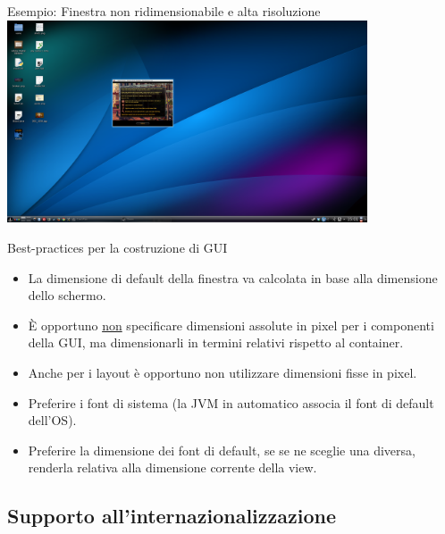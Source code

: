 \documentclass[presentation]{beamer}
\begin{document}
\begin{frame}{Esempio: Finestra non ridimensionabile e alta risoluzione}
\centering
\includegraphics[width=0.8\textwidth]{img/brokensword}
\end{frame}

\begin{frame}{Best-practices per la costruzione di GUI}
\begin{itemize}\itemsep10pt
\item La dimensione di default della finestra va calcolata in base alla dimensione dello schermo.
\item \`{E} opportuno \underline{non} specificare dimensioni assolute in pixel per i componenti della GUI, ma dimensionarli in termini relativi rispetto al container.
\item Anche per i layout è opportuno non utilizzare dimensioni fisse in pixel.
\item Preferire i font di sistema (la JVM in automatico associa il font di default dell'OS).
\item Preferire la dimensione dei font di default, se se ne sceglie una diversa, renderla relativa alla dimensione corrente della view.
\end{itemize}
\end{frame}

\subsection{Supporto all'internazionalizzazione}
\end{document}
